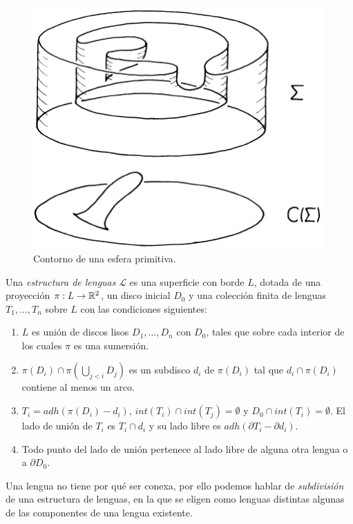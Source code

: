\documentclass[twoside, 11pt]{article}
\begin{document}
 \begin{figure}[h!]
\includegraphics[scale=0.5]{contorno}
\caption{Contorno de una esfera primitiva.}\label{contorno}
\end{figure}

\begin{defi}\label{lenguas}
Una \emph{estructura de lenguas} $\mathcal{L}$ es una superficie con borde $L$, dotada de una proyección $\pi:L\to\mathbb{R}^2$, un disco inicial $D_0$ y una colección finita de lenguas $T_1,\dots, T_n$ sobre $L$ con las condiciones siguientes:
\begin{enumerate}
\item $L$ es unión de discos lisos $D_1,\dots, D_n$ con $D_0$, tales que sobre cada interior de los cuales $\pi$ es una sumersión. 
\item $\pi(D_i)\cap\pi\left(\bigcup_{j<i}D_j\right)$ es un subdisco $d_i$ de $\pi(D_i)$ tal que $d_i\cap\pi(D_i)$ contiene al menos un arco. 
\item $T_i=adh(\pi(D_i)-d_i)$, $int(T_i)\cap int(T_j)=\emptyset$ y $D_0\cap int(T_i)=\emptyset$. El lado de unión de $T_i$ es $T_i\cap d_i$ y su lado libre es $adh(\partial T_i-\partial d_i)$. 
\item Todo punto del lado de unión pertenece al lado libre de alguna otra lengua o a $\partial D_0$.  
\end{enumerate}
\end{defi}

Una lengua no tiene por qué ser conexa, por ello podemos hablar de \emph{subdivisión} de una estructura de lenguas, en la que se eligen como lenguas distintas algunas de las componentes de una lengua existente. 
\end{document}
